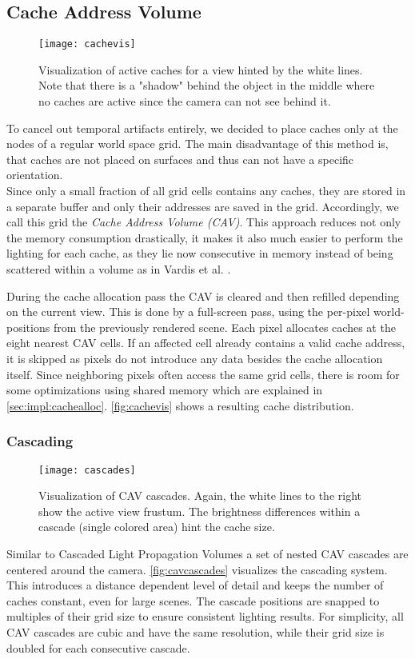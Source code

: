 \documentclass[thesis.tex]{subfiles}
\begin{document}
\subsection{Cache Address Volume}
\begin{figure}[h]
	\centering
	\texttt{[image: cachevis]}
	\caption{Visualization of active caches for a view hinted by the white lines. Note that there is a "shadow" behind the object in the middle where no caches are active since the camera can not see behind it.} \label{fig:cachevis}
\end{figure}
To cancel out temporal artifacts entirely, we decided to place caches only at the nodes of a regular world space grid.
The main disadvantage of this method is, that caches are not placed on surfaces and thus can not have a specific orientation.\\
Since only a small fraction of all grid cells contains any caches, they are stored in a separate buffer and only their addresses are saved in the grid.
Accordingly, we call this grid the \emph{Cache Address Volume (CAV)}.
This approach reduces not only the memory consumption drastically, it makes it also much easier to perform the lighting for each cache, as they lie now consecutive in memory instead of being scattered within a volume as in Vardis et al. \cite{bib:radiancecachechromaticcompression}.

During the cache allocation pass the CAV is cleared and then refilled depending on the current view.
This is done by a full-screen pass, using the per-pixel world-positions from the previously rendered scene. %
Each pixel allocates caches at the eight nearest CAV cells.
If an affected cell already contains a valid cache address, it is skipped as pixels do not introduce any data besides the cache allocation itself.
Since neighboring pixels often access the same grid cells, there is room for some optimizations using shared memory which are explained in \autoref{sec:impl:cachealloc}.
\autoref{fig:cachevis} shows a resulting cache distribution.

\subsubsection{Cascading} \label{sec:impl:cavcascading}
\begin{figure}[h]
	\centering
	\texttt{[image: cascades]}
	\caption{Visualization of CAV cascades. Again, the white lines to the right show the active view frustum. The brightness differences within a cascade (single colored area) hint the cache size.} \label{fig:cavcascades}
\end{figure}
Similar to Cascaded Light Propagation Volumes \cite{bib:lpt} a set of nested CAV cascades are centered around the camera.
\autoref{fig:cavcascades} visualizes the cascading system.
This introduces a distance dependent level of detail and keeps the number of caches constant, even for large scenes.
The cascade positions are snapped to multiples of their grid size to ensure consistent lighting results. %
For simplicity, all CAV cascades are cubic and have the same resolution, while their grid size is doubled for each consecutive cascade.
\end{document}
